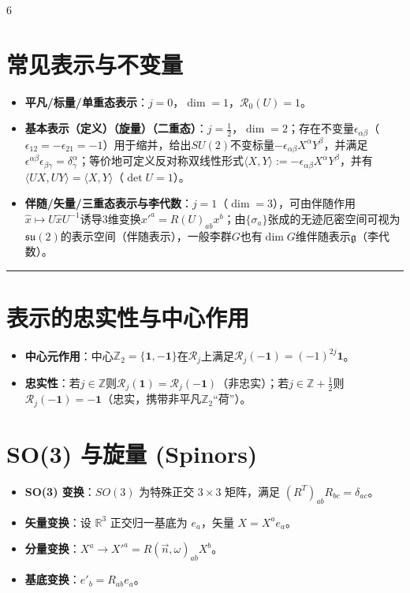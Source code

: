 \documentclass[landscape]{article}
\begin{document}
\begin{multicols*}{6}
\section*{常见表示与不变量}
\begin{itemize}
  \item \textbf{平凡/标量/单重态表示}：$j=0$，$\dim=1$，$\mathcal R_0(U)=1$。
  \item \textbf{基本表示（定义）（旋量）（二重态）}：$j=\tfrac12$，$\dim=2$；存在不变量$\epsilon_{\alpha\beta}$（$\epsilon_{12}=-\epsilon_{21}=-1$）用于缩并，给出$SU(2)$不变标量$-\epsilon_{\alpha\beta}X^\alpha Y^\beta$，并满足$\epsilon^{\alpha\beta}\epsilon_{\beta\gamma}=\delta^\alpha_\gamma$；等价地可定义反对称双线性形式$\langle X,Y\rangle:=-\epsilon_{\alpha\beta}X^\alpha Y^\beta$，并有$\langle UX,UY\rangle=\langle X,Y\rangle$（$\det U=1$）。
  \item \textbf{伴随/矢量/三重态表示与李代数}：$j=1$（$\dim=3$），可由伴随作用$\hat x\mapsto U\hat xU^{-1}$诱导$3$维变换$x'^a=R(U)_{ab}x^b$；由$\{\sigma_a\}$张成的无迹厄密空间可视为$\mathfrak{su}(2)$的表示空间（伴随表示），一般李群$G$也有$\dim G$维伴随表示$\mathfrak g$（李代数）。
\end{itemize}
\noindent\textcolor{blue}{\rule{\linewidth}{1pt}}
\section*{表示的忠实性与中心作用}
\begin{itemize}
  \item \textbf{中心元作用}：中心$\mathbb{Z}_2=\{\mathbf{1},-\mathbf{1}\}$在$\mathcal R_j$上满足$\mathcal R_j(-\mathbf{1})=(-1)^{2j}\mathbf{1}$。
  \item \textbf{忠实性}：若$j\in\mathbb{Z}$则$\mathcal R_j(\mathbf{1})=\mathcal R_j(-\mathbf{1})$（非忠实）；若$j\in\mathbb{Z}+\tfrac12$则$\mathcal R_j(-\mathbf{1})=-\mathbf{1}$（忠实，携带非平凡$\mathbb{Z}_2$“荷”）。
\end{itemize}

\section*{SO(3) 与旋量 (Spinors)}
\begin{itemize}
  \item \textbf{SO(3) 变换}：$SO(3)$ 为特殊正交 $3\times3$ 矩阵，满足 $(R^T)_{ab}R_{bc}=\delta_{ac}$。
  \item \textbf{矢量变换}：设 $\mathbb{R}^3$ 正交归一基底为 $e_a$，矢量 $X=X^a e_a$。
  \item \textbf{分量变换}：$X^a \to X'^a = R(\vec{n},\omega)_{ab}X^b$。
  \item \textbf{基底变换}：$e'_b = R_{ab}e_a$。
\end{itemize}


\end{multicols*}
\end{document}
